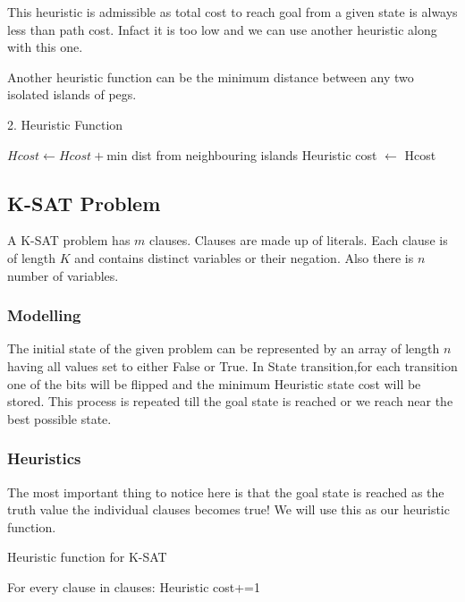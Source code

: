 \documentclass[journal, compsoc]{IEEEtran}
\begin{document}
This heuristic is admissible as total cost to reach goal from a given state is always less than path cost. Infact it is too low and we can use another heuristic along with this one.

Another heuristic function can be the minimum distance between any two isolated islands of pegs.
\begin{algorithm}
\caption{2. Heuristic Function}
\begin{algorithmic}[1]
 
\State $Hcost \gets Hcost + $min dist from neighbouring islands
\EndWhile
\State Heuristic cost $\gets$ Hcost
\EndProcedure
\end{algorithmic}
\end{algorithm}

\subsection{K-SAT Problem}
A K-SAT problem has $m$ clauses. Clauses are made up of literals. Each clause is of length $K$ and contains distinct variables or their negation. Also there is $n$ number of variables.
\subsubsection{Modelling}
The initial state of the given problem can be represented by an array of length $n$ having all values set to either False or True. In State transition,for each transition one of the bits
will be flipped and the minimum Heuristic state cost will be stored. This process is repeated till the goal state is reached or we reach near the best possible state.

\subsubsection{Heuristics}
The most important thing to notice here is that the goal state is reached as the truth value the individual clauses becomes true! We will use this as our heuristic function.
\begin{algorithm}
\caption{Heuristic function for K-SAT}
\begin{algorithmic}
 
For every clause in clauses:
    Heuristic cost+=1
\end{algorithmic}
\end{algorithm}
\end{document}
